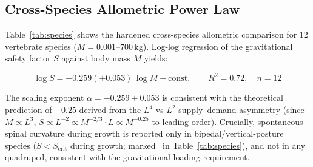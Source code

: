 \documentclass[12pt, letterpaper]{article}
\begin{document}
\subsection{Cross-Species Allometric Power Law}

Table~\ref{tab:species} shows the hardened cross-species allometric comparison
for 12 vertebrate species ($M = 0.001$--$700$\,kg). Log-log regression of the
gravitational safety factor $S$ against body mass $M$ yields:

\begin{equation}
  \log S = -0.259(\pm 0.053)\,\log M + \text{const},
  \qquad R^{2} = 0.72, \quad n = 12
  \label{eq:powerlaw}
\end{equation}

The scaling exponent $\alpha = -0.259 \pm 0.053$ is consistent with the
theoretical prediction of $-0.25$ derived from the $L^{4}$-vs-$L^{2}$ supply--demand
asymmetry (since $M \propto L^{3}$, $S \propto L^{-2} \propto M^{-2/3} \cdot L
\propto M^{-0.25}$ to leading order). Crucially, spontaneous spinal curvature
during growth is reported only in bipedal/vertical-posture species ($S < S_{\mathrm{crit}}$
during growth; marked \dag\ in Table~\ref{tab:species}), and not in any
quadruped, consistent with the gravitational loading requirement.
\end{document}
